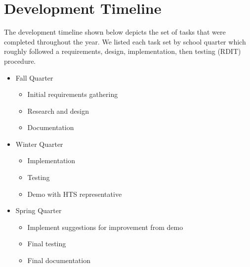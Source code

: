 \chapter{Development Timeline}
The development timeline shown below depicts the set of tasks that were completed throughout the year. We listed each task set by school quarter which roughly followed a requirements, design, implementation, then testing (RDIT) procedure.

\begin{itemize}
	\item Fall Quarter
		\begin{itemize}
			\item Initial requirements gathering
			\item Research and design
			\item Documentation
		\end{itemize}
	\item Winter Quarter
		\begin{itemize}
			\item Implementation
			\item Testing
			\item Demo with HTS representative
		\end{itemize}
	\item Spring Quarter
		\begin{itemize}
			\item Implement suggestions for improvement from demo
			\item Final testing
			\item Final documentation
		\end{itemize}
\end{itemize}